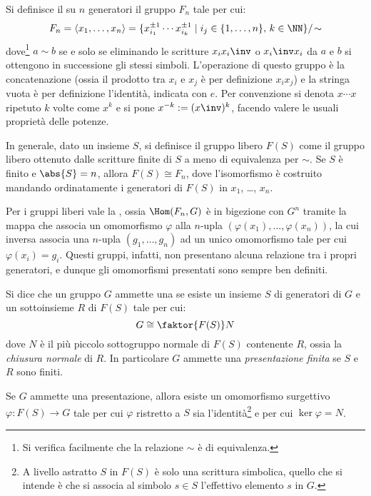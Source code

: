 \documentclass[11pt]{scrartcl}
\begin{document}
	\begin{definition}
		Si definisce il  su $n$ generatori
		il gruppo $F_n$ tale per cui:
		\[ F_n = \langle{x_1, \ldots, x_n\rangle} = \{ x_{i_1}^{\pm 1} \cdots x_{i_k}^{\pm 1} \mid i_j \in \{1, \ldots, n\}, \, k \in \NN \} / \! \sim \]
		dove\footnote{
			Si verifica facilmente che la relazione $\sim$ è di equivalenza.
		} $a \sim b$ se e solo se eliminando le scritture $x_i x_i\inv$ 
		o $x_i\inv x_i$ da $a$ e $b$ si ottengono in successione gli stessi simboli.
		L'operazione di
		questo gruppo è la concatenazione (ossia il prodotto tra
		$x_i$ e $x_j$ è per definizione $x_i x_j$) e la stringa
		vuota è per definizione l'identità, indicata con $e$.
		Per convenzione si denota $x \cdots x$ ripetuto $k$ volte come $x^k$ e si pone $x^{-k} := (x\inv)^k$, facendo
		valere le usuali proprietà delle potenze.
	\end{definition}
	
	
	\begin{remark}
		In generale, dato un insieme $S$, si definisce
		il gruppo libero $F(S)$ come il gruppo libero ottenuto
		dalle scritture finite di $S$ a meno di equivalenza per
		$\sim$. Se $S$ è finito e $\abs{S} = n$, allora
		$F(S) \cong F_n$, dove l'isomorfismo è costruito mandando
		ordinatamente i generatori di $F(S)$ in
		$x_1$, \ldots, $x_n$.
	\end{remark}
	
	
	Per i gruppi liberi vale la \vocab{proprietà universale},
	ossia $\Hom(F_n, G)$ è in bigezione con $G^n$ tramite
	la mappa che associa un omomorfismo $\varphi$ alla $n$-upla
	$(\varphi(x_1), \ldots, \varphi(x_n))$, la cui inversa associa
	una $n$-upla $(g_1, \ldots, g_n)$ ad un unico omomorfismo
	tale per cui $\varphi(x_i) = g_i$. Questi gruppi, infatti,
	non presentano alcuna relazione tra i propri generatori,
	e dunque gli omomorfismi presentati sono sempre ben definiti. \medskip
	
	
	\begin{definition}
		Si dice che un gruppo $G$ ammette una  se esiste un insieme $S$ di generatori di $G$ e un sottoinsieme $R$ di $F(S)$ tale per cui:
		\[ G \cong \faktor{F(S)}N \]
		dove $N$ è il più piccolo sottogruppo normale di
		$F(S)$ contenente $R$, ossia la \textit{chiusura normale}
		di $R$. In particolare $G$ ammette una \textit{presentazione finita} se $S$ e $R$ sono finiti.
	\end{definition}
	\medskip
	
	
	Se $G$ ammette una presentazione, allora esiste un
	omomorfismo surgettivo $\varphi : F(S) \to G$ tale
	per cui $\varphi$ ristretto a $S$ sia l'identità\footnote{
		A livello astratto $S$ in $F(S)$ è solo una scrittura
		simbolica, quello che si intende è che si associa
		al simbolo $s \in S$ l'effettivo elemento $s$ in
		$G$.
	} e per cui $\ker \varphi = N$. \medskip
	
\end{document}
